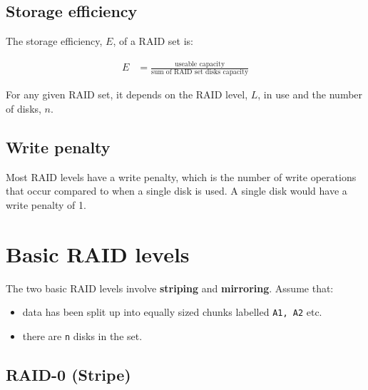 \documentclass[slides]{pgnotes}
\begin{document}
\subsection{Storage efficiency}
\label{sec:storage-efficiency}

The storage efficiency, $E$, of a RAID set is:

\begin{align}
  E & = \frac{\mbox{useable capacity}}{\mbox{sum of RAID set disks capacity}} \label{eq:raid-storage-efficiency}
\end{align}

For any given RAID set, it depends on the RAID level, $L$, in use
and the number of disks, $n$.

\subsection{Write penalty}
\label{sec:write-penalty}

Most RAID levels have a write penalty, which is the number of write
operations that occur compared to when a single disk is used. A single
disk would have a write penalty of 1.

\section{Basic RAID levels}
\label{sec:basic-raid-levels}

The two basic RAID levels involve \textbf{striping} and \textbf{mirroring}. Assume that:
\begin{itemize}
  \item data has been split up into equally sized chunks labelled \texttt{A1, A2} etc.
  \item there are \texttt{n} disks in the set.
  \end{itemize}

\subsection{RAID-0 (Stripe)}
\label{sec:raid-0-stripe}
\end{document}
